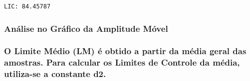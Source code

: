 \documentclass[
  letterpaper,
  DIV=11,
  numbers=noendperiod]{scrartcl}
\begin{document}
\begin{verbatim}
LIC: 84.45787 
\end{verbatim}

\subsubsection{Análise no Gráfico da Amplitude
Móvel}\label{anuxe1lise-no-gruxe1fico-da-amplitude-muxf3vel}

\subsubsection{O Limite Médio (LM) é obtido a partir da média geral das
amostras. Para calcular os Limites de Controle da média, utiliza-se a
constante
d2.}\label{o-limite-muxe9dio-lm-uxe9-obtido-a-partir-da-muxe9dia-geral-das-amostras.-para-calcular-os-limites-de-controle-da-muxe9dia-utiliza-se-a-constante-d2.-1}
\end{document}
